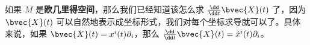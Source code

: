 






如果 $M$ 是\textbf{欧几里得空间}，那么我们已经知道该怎么求 $\frac{\dd}{\dd t}\bvec{X}(t)$ 了，因为 $\bvec{X}(t)$ 可以自然地表示成坐标形式，我们对每个坐标求导就可以了。具体来说，如果 $\bvec{X}(t)=x^i(t)\partial_i$，那么 $\frac{\dd}{\dd t}\bvec{X}(t)=\dot{x}^i(t)\partial_i$。

